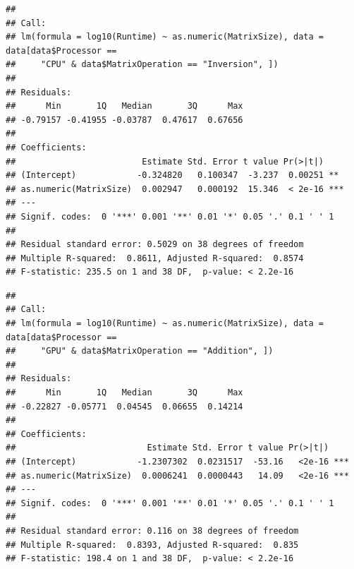 \documentclass[
]{article}
\newenvironment{Shaded}{\begin{snugshade}}{\end{snugshade}}
\newcommand{\DataTypeTok}[1]{\textcolor[rgb]{0.13,0.29,0.53}{#1}}
\newcommand{\KeywordTok}[1]{\textcolor[rgb]{0.13,0.29,0.53}{\textbf{#1}}}
\newcommand{\NormalTok}[1]{#1}
\newcommand{\OperatorTok}[1]{\textcolor[rgb]{0.81,0.36,0.00}{\textbf{#1}}}
\newcommand{\StringTok}[1]{\textcolor[rgb]{0.31,0.60,0.02}{#1}}
\begin{document}
\begin{verbatim}
## 
## Call:
## lm(formula = log10(Runtime) ~ as.numeric(MatrixSize), data = data[data$Processor == 
##     "CPU" & data$MatrixOperation == "Inversion", ])
## 
## Residuals:
##      Min       1Q   Median       3Q      Max 
## -0.79157 -0.41955 -0.03787  0.47617  0.67656 
## 
## Coefficients:
##                         Estimate Std. Error t value Pr(>|t|)    
## (Intercept)            -0.324820   0.100347  -3.237  0.00251 ** 
## as.numeric(MatrixSize)  0.002947   0.000192  15.346  < 2e-16 ***
## ---
## Signif. codes:  0 '***' 0.001 '**' 0.01 '*' 0.05 '.' 0.1 ' ' 1
## 
## Residual standard error: 0.5029 on 38 degrees of freedom
## Multiple R-squared:  0.8611, Adjusted R-squared:  0.8574 
## F-statistic: 235.5 on 1 and 38 DF,  p-value: < 2.2e-16
\end{verbatim}

\begin{Shaded}
\end{Shaded}

\begin{verbatim}
## 
## Call:
## lm(formula = log10(Runtime) ~ as.numeric(MatrixSize), data = data[data$Processor == 
##     "GPU" & data$MatrixOperation == "Addition", ])
## 
## Residuals:
##      Min       1Q   Median       3Q      Max 
## -0.22827 -0.05771  0.04545  0.06655  0.14214 
## 
## Coefficients:
##                          Estimate Std. Error t value Pr(>|t|)    
## (Intercept)            -1.2307302  0.0231517  -53.16   <2e-16 ***
## as.numeric(MatrixSize)  0.0006241  0.0000443   14.09   <2e-16 ***
## ---
## Signif. codes:  0 '***' 0.001 '**' 0.01 '*' 0.05 '.' 0.1 ' ' 1
## 
## Residual standard error: 0.116 on 38 degrees of freedom
## Multiple R-squared:  0.8393, Adjusted R-squared:  0.835 
## F-statistic: 198.4 on 1 and 38 DF,  p-value: < 2.2e-16
\end{verbatim}

\begin{Shaded}
\end{Shaded}
\end{document}

